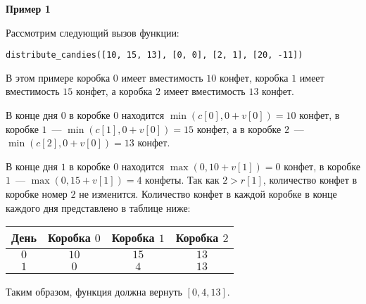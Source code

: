 \textbf{Пример 1}

Рассмотрим следующий вызов функции:

\texttt{distribute\_candies([10, 15, 13], [0, 0], [2, 1], [20, -11])}
	
В этом примере коробка $0$ имеет вместимость $10$ конфет, коробка $1$ имеет вместимость $15$ конфет, а коробка $2$ имеет вместимость $13$ конфет.

В конце дня $0$ в коробке $0$ находится $\min(c[0], 0+v[0]) = 10$ конфет, в коробке $1$~--- $\min(c[1], 0+v[0])=15$ конфет, а в коробке $2$~--- $\min(c[2], 0+v[0])=13$ конфет.

В конце дня $1$ в коробке $0$ находится $\max(0, 10+v[1]) = 0$ конфет, в коробке $1$~--- $\max(0, 15+v[1]) = 4$ конфеты. Так как $2 > r[1]$, количество конфет в коробке номер $2$ не изменится. Количество конфет в каждой коробке в конце каждого дня представлено в таблице ниже:
\begin{center}
\renewcommand{\arraystretch}{1.5}
\begin{tabular}{|c|c|c|c|}
\hline
 День & Коробка $0$ & Коробка $1$ & Коробка $2$ \\
\hline
$0$ & $10$ & $15$ & $13$ \\
\hline
$1$ & $0$ & $4$ & $13$ \\
\hline

\end{tabular}
\end{center}

Таким образом, функция должна вернуть $[0, 4, 13]$.

